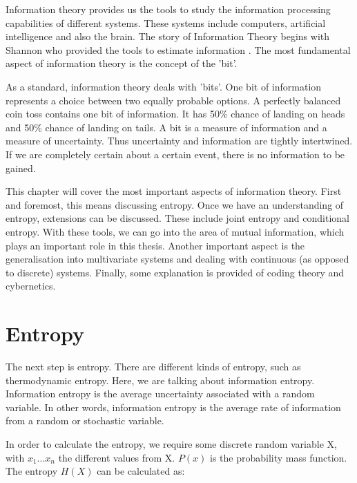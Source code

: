 Information theory provides us the tools to study the information processing capabilities of different systems. These systems include computers, artificial intelligence and also the brain. The story of Information Theory begins with Shannon who provided the tools to estimate information \cite{shin1949mathematical}. The most fundamental aspect of information theory is the concept of the 'bit'. 

As a standard, information theory deals with 'bits'. One bit of information represents a choice between two equally probable options. A perfectly balanced coin toss contains one bit of information. It has 50\% chance of landing on heads and 50\% chance of landing on tails. A bit is a measure of information and a measure of uncertainty. Thus uncertainty and information are tightly intertwined. If we are completely certain about a certain event, there is no information to be gained. 

This chapter will cover the most important aspects of information theory. First and foremost, this means discussing entropy. Once we have an understanding of entropy, extensions can be discussed. These include joint entropy and conditional entropy. With these tools, we can go into the area of mutual information, which plays an important role in this thesis. Another important aspect is the generalisation into multivariate systems and dealing with continuous (as opposed to discrete) systems. Finally, some explanation is provided of coding theory and cybernetics.

\section{Entropy}

The next step is entropy. There are different kinds of entropy, such as thermodynamic entropy. Here, we are talking about information entropy. Information entropy is the average uncertainty associated with a random variable. In other words, information entropy is the average rate of information from a random or stochastic variable. 

In order to calculate the entropy, we require some discrete random variable X, with ${x_1 ... x_n}$ the different values from X. $P(x)$ is the probability mass function. The entropy $H(X)$ can be calculated as:

